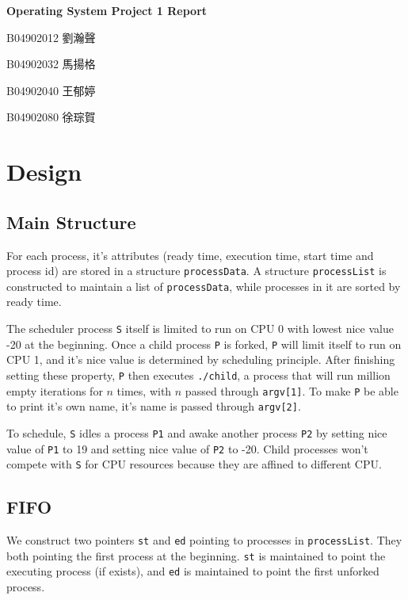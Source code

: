 \documentclass{article}
\begin{document}
\fontsize{12pt}{20pt}\selectfont
\begin{center}
	\bfseries\huge{Operating System Project 1 Report}\\
\end{center}
{
    \hfill B04902012 劉瀚聲

    \hfill B04902032 馬揚格

    \hfill B04902040 王郁婷

    \hfill B04902080 徐琮賀\\
}
\section{Design}
    \subsection{Main Structure}

        For each process, it's attributes (ready time, execution time, start time and process id) are stored in a structure {\tt processData}.
        A structure {\tt processList} is constructed to maintain a list of {\tt processData}, while processes in it are sorted by ready time.

        The scheduler process {\tt S} itself is limited to run on CPU 0 with lowest nice value -20 at the beginning. Once a child process {\tt P} is forked, {\tt P} will limit itself to run on CPU 1, and it's nice value is determined by scheduling principle. After finishing setting these property, {\tt P} then executes {\tt ./child}, a process that will run million empty iterations for \(n\) times, with \(n\) passed through {\tt argv[1]}. To make {\tt P} be able to print it's own name, it's name is passed through {\tt argv[2]}.


        To schedule, {\tt S} idles a process {\tt P1} and awake another process {\tt P2} by setting nice value of {\tt P1}  to 19 and setting nice value of {\tt P2} to -20. Child processes won't compete with {\tt S} for CPU resources because they are affined to different CPU.
    
    \subsection{FIFO}
        We construct two pointers {\tt st} and {\tt ed} pointing to processes in {\tt processList}. They both pointing the first process at the beginning. {\tt st} is maintained to point the executing process (if exists), and {\tt ed} is maintained to point the first unforked process.
        
\end{document}
